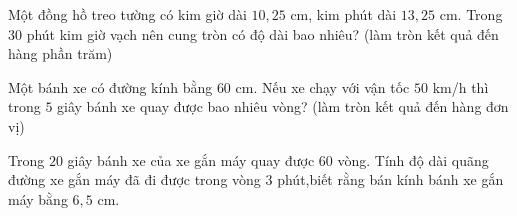 
\begin{ex}%
	Một đồng hồ treo  tường có kim giờ dài $10{,}25$ cm, kim phút dài $13{,}25$ cm. Trong $30$ phút kim giờ vạch nên cung tròn có độ dài bao nhiêu? (làm tròn kết quả đến hàng phần trăm)
\end{ex}

\begin{ex}%
	Một bánh xe có đường kính bằng $60$ cm. Nếu xe chạy với vận tốc $50$ km/h thì trong $5$ giây bánh xe quay  được bao nhiêu vòng? (làm tròn kết quả đến hàng đơn vị)
\end{ex}

\begin{ex}%
	Trong $20$ giây bánh xe của xe gắn máy quay được $60$ vòng. Tính độ  dài quãng đường xe gắn máy đã đi được trong vòng $3$ phút,biết rằng bán kính bánh xe gắn máy bằng $6{,}5$ cm.
\end{ex}

